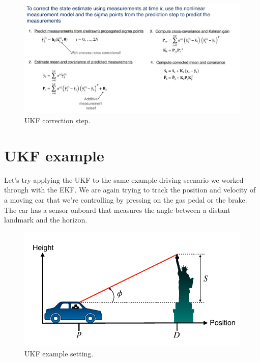 \begin{figure}[!htb]
\begin{center}
\includegraphics[scale=0.280]{img/kalman_filter/unscented_kalman_filter_4.jpeg}
\end{center}
\caption{UKF correction step.}
\label{unscented_kalman_filter_4}
\end{figure}

\section{UKF example}

Let's try applying the UKF to the same example driving scenario we worked through with the EKF. We are again trying to track the position
and velocity of a moving car that we're controlling by pressing
on the gas pedal or the brake. The car has a sensor onboard that measures
the angle between a distant landmark and the horizon. 

\begin{figure}[!htb]
\begin{center}
\includegraphics[scale=0.280]{img/kalman_filter/unscented_kalman_filter_5.jpeg}
\end{center}
\caption{UKF example setting.}
\label{unscented_kalman_filter_5}
\end{figure}

